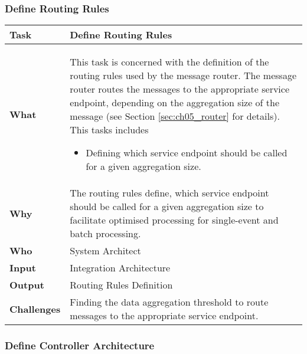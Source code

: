 \subsubsection{Define Routing Rules}
\begin{tabularx}{\textwidth}{@{} l X @{}}
	\caption{Define Routing Rules}\label{table:ch6_Task_Define_Routing_Rules}\\
	\toprule 
	\bfseries Task & Define Routing Rules\\
	\midrule 
	\bfseries What & 
	This task is concerned with the definition of the routing rules used by the message router. The message router routes the messages to the appropriate service endpoint, depending on the aggregation size of the message (see Section \ref{sec:ch05_router} for details). This tasks includes
	\begin{itemize}
		\item Defining which service endpoint should be called for a given aggregation size.
	\end{itemize}
	\\
	\midrule 
	\bfseries Why & The routing rules define, which service endpoint should be called for a given aggregation size to facilitate optimised processing for single-event and batch processing.\\
	\midrule
	\bfseries Who & System Architect\\
	\midrule
	\bfseries Input & Integration Architecture\\
	\midrule 
	\bfseries Output & Routing Rules Definition\\
	\midrule 
	\bfseries Challenges & Finding the data aggregation threshold to route messages to the appropriate service endpoint.\\
	\bottomrule 
\end{tabularx}

\subsubsection{Define Controller Architecture}

